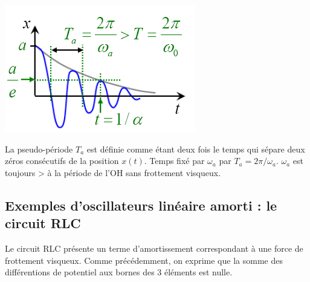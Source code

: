 \documentclass	[11pt, a4paper, openany]{book}
\begin{document}
	\begin{center}
		\includegraphics[scale=0.45]{oo/image8.png}
	\end{center}
	La pseudo-période $T_a$ est définie comme étant deux fois le temps qui sépare deux zéros consécutifs de la position $x(t)$. Temps fixé par $\omega_a$ par $T_a = 2\pi/\omega_a$. $\omega_a$ est toujours > à la période de l'OH sans frottement visqueux.
	
	\subsection{Exemples d'oscillateurs linéaire amorti : le circuit RLC}
	Le circuit RLC présente un terme d'amortissement correspondant à une force de frottement visqueux. Comme précédemment, on exprime que la somme des différentions de potentiel aux bornes des 3 éléments est nulle.
	
\end{document}
